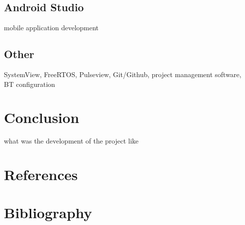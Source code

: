 \documentclass[12pt,a4paper]{article}
\begin{document}
		\subsection{Android Studio}
		mobile application development
		\newpage
		
		\subsection{Other}
		SystemView, FreeRTOS, Pulseview, Git/Github, project management software, BT configuration
		\newpage
	
	\section{Conclusion}
	what was the development of the project like
	\newpage
	
	\section{References}
	\newpage
	
	\section{Bibliography}
	\newpage
	
	\listoffigures
	
\end{document}
